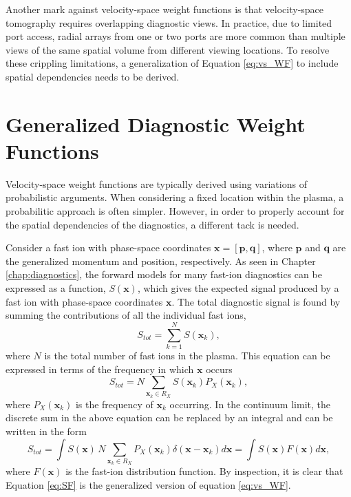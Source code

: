 Another mark against velocity-space weight functions is that velocity-space tomography requires overlapping diagnostic views.
In practice, due to limited port access, radial arrays from one or two ports are more common than multiple views of the same spatial volume from different viewing locations. 
To resolve these crippling limitations, a generalization of Equation \ref{eq:vs_WF} to include spatial dependencies needs to be derived.

\section{Generalized Diagnostic Weight Functions} \label{sec:generalized_weight}
Velocity-space weight functions are typically derived using variations of probabilistic arguments\cite{salewski2011,salewski2014,jacobsen2015,salewski2015,salewski2015}. When considering a fixed location within the plasma, a probabilitic approach is often simpler. However, in order to properly account for the spatial dependencies of the diagnostics, a different tack is needed.

Consider a fast ion with phase-space coordinates $\mathbf{x} = [\mathbf{p},\mathbf{q}]$, where $\mathbf{p}$ and $\mathbf{q}$ are the generalized momentum and position, respectively.
As seen in Chapter \ref{chap:diagnostics}, the forward models for many fast-ion diagnostics can be expressed as a function, $S(\mathbf{x})$, which gives the expected signal produced by a fast ion with phase-space coordinates $\mathbf{x}$.
The total diagnostic signal is found by summing the contributions of all the individual fast ions,
\begin{equation}\label{eq:sum_S}
    S_{tot} = \sum_{k=1}^N S(\mathbf{x}_k),
\end{equation}
where $N$ is the total number of fast ions in the plasma.
This equation can be expressed in terms of the frequency in which $\mathbf{x}$ occurs
\begin{equation}\label{eq:sum_SP}
    S_{tot} = N \sum_{\mathbf{x}_k \in R_{X}} S(\mathbf{x}_k) P_X(\mathbf{x}_k),
\end{equation}
where $P_X(\mathbf{x}_k)$ is the frequency of $\mathbf{x}_k$ occurring.
In the continuum limit, the discrete sum in the above equation can be replaced by an integral and can be written in the form
\begin{equation}\label{eq:SF}
    S_{tot} = \int S(\mathbf{x})\,N \sum_{\mathbf{x}_k \in R_{X}} P_X(\mathbf{x}_k) \delta(\mathbf{x} - \mathbf{x}_k) d\mathbf{x} = \int S(\mathbf{x}) F(\mathbf{x}) d\mathbf{x},
\end{equation}
where $F(\mathbf{x})$ is the fast-ion distribution function.
By inspection, it is clear that Equation \ref{eq:SF} is the generalized version of equation \ref{eq:vs_WF}.

